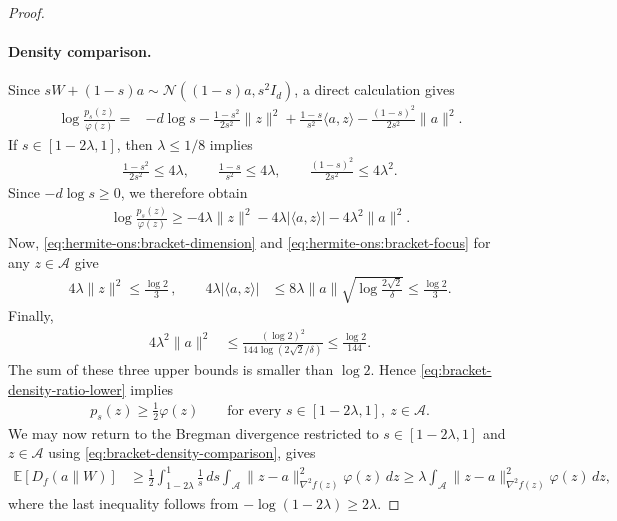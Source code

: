 \documentclass{article}
\theoremstyle{plain}
\theoremstyle{definition}
\theoremstyle{plain}
\newcommand{\E}{\mathbb E}
\newcommand{\cN}{\mathcal N}
\begin{document}
\begin{proof}
    \paragraph{Density comparison.}
    Since $sW + (1-s) a\sim\cN((1-s)a, s^2I_d)$, a direct calculation gives
    \begin{align}
        \log\frac{p_s(z)}{\varphi(z)}
        ={} &
        -d\log s
        -\frac{1-s^2}{2s^2}\|z\|^2
        +\frac{1-s}{s^2}\langle a,z\rangle
        -\frac{(1-s)^2}{2s^2}\|a\|^2.
        \label{eq:bracket-density-ratio}
    \end{align}
    If $s\in[1-2\lambda,1]$, then $\lambda\leq1/8$ implies
    \begin{align}
        \frac{1-s^2}{2s^2}\leq4\lambda,
        \qquad
        \frac{1-s}{s^2}\leq4\lambda,
        \qquad
        \frac{(1-s)^2}{2s^2}\leq4\lambda^2.
    \end{align}
    Since $-d\log s\geq0$, we therefore obtain
    \begin{align}
        \log\frac{p_s(z)}{\varphi(z)}
        \geq
        -4\lambda\|z\|^2
        -4\lambda|\langle a,z\rangle|
        -4\lambda^2\|a\|^2.
        \label{eq:bracket-density-ratio-lower}
    \end{align}
    Now, \eqref{eq:hermite-ons:bracket-dimension} and \eqref{eq:hermite-ons:bracket-focus}
    for any $z\in\mathcal A$ give
    \begin{align}
        4\lambda\|z\|^2
        \leq
        \frac{\log2}{3}\,,
        \qquad
        4\lambda|\langle a,z\rangle|
         & \leq
        8\lambda\|a\|
        \sqrt{\log\frac{2\sqrt2}{\delta}}
        \leq
        \frac{\log2}{3}.
    \end{align}
    Finally,
    \begin{align}
        4\lambda^2\|a\|^2
         & \leq
        \frac{(\log2)^2}
        {144\log(2\sqrt2/\delta)}
        \leq
        \frac{\log2}{144}.
    \end{align}
    The sum of these three upper bounds is smaller than $\log2$.
    Hence \eqref{eq:bracket-density-ratio-lower} implies
    \begin{align}
        p_s(z)\geq\frac12\varphi(z)
        \qquad
        \text{for every }
        s\in[1-2\lambda,1],\ z\in\mathcal A.
        \label{eq:bracket-density-comparison}
    \end{align}
    We may now return to the Bregman divergence restricted to
    $s\in[1-2\lambda,1]$ and $z\in\mathcal A$ using
    \eqref{eq:bracket-density-comparison}, gives
    \begin{align}
        \E[D_f(a\|W)]
         & \geq
        \frac12
        \int_{1-2\lambda}^1\frac{1}{s}\,ds
        \int_{\mathcal A}
        \|z - a\|_{\nabla^2f(z)}^2
        \varphi(z)\,dz
        \geq
        \lambda
        \int_{\mathcal A}
        \|z - a\|_{\nabla^2f(z)}^2
        \varphi(z)\,dz,
        \label{eq:bracket-bregman-lower}
    \end{align}
    where the last inequality follows from
    $-\log(1-2\lambda)\geq2\lambda$.


\end{proof}
\end{document}
